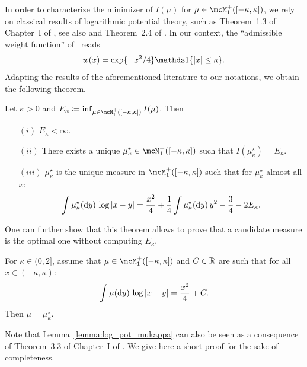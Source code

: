  \myskip 
In order to characterize the minimizer of $I(\mu)$ for $\mu \in \mcM_1^+([-\kappa,\kappa])$, we
rely on classical results of logarithmic potential theory, such as Theorem~1.3 of Chapter~I of \cite{saff2013logarithmic}, see also \cite{mhaskar1985does} and Theorem~2.4 of \cite{arous1997large}.
In our context, the ``admissible weight function'' of~\cite{saff2013logarithmic} reads
\begin{equation*}
    w(x) = \exp\{-x^2/4\} \indi\{|x| \leq \kappa\}.
\end{equation*}
Adapting the results of the aforementioned literature to our notations, we obtain the following theorem.
\begin{theorem}
    \label{thm:properties_inf_I}
    Let $\kappa > 0$ and
    $E_\kappa \coloneqq \inf_{\mu \in \mcM_1^+([-\kappa,\kappa])} I(\mu)$. Then
    \begin{itemize}
        \item[$(i)$] $E_\kappa < \infty$.
        \item[$(ii)$] There exists a unique $\mu_\kappa^\star \in \mcM_1^+([-\kappa,\kappa])$ such that $I(\mu_\kappa^\star) = E_\kappa$.
        \item[$(iii)$] $\mu_\kappa^\star$ is the unique measure in $\mcM_1^+([-\kappa,\kappa])$ such that for $\mu_\kappa^\star$-almost all $x$: 
        \begin{equation*}
            \int \mu_\kappa^\star(\mathrm{d} y) \, \log |x - y| = \frac{x^2}{4} + \frac{1}{4} \int \mu_\kappa^\star(\mathrm{d} y) \, y^2 - \frac{3}{4} - 2 E_\kappa.
        \end{equation*}
    \end{itemize} 
\end{theorem}
\noindent
One can further show that this theorem allows to prove that a candidate measure is the optimal one without computing $E_\kappa$.
\begin{lemma}\label{lemma:log_pot_mukappa}
    For $\kappa \in (0,2]$, assume that $\mu \in \mcM_1^+([-\kappa,\kappa])$ and $C \in \mathbb{R}$ are such that for all $x \in (-\kappa,\kappa)$:
    \begin{equation}\label{eq:log_pot_mukappa_hyp}
        \int \mu(\mathrm{d} y) \, \log |x - y| = \frac{x^2}{4} + C.
    \end{equation}
    Then $\mu = \mu_\kappa^\star$.
\end{lemma}
\noindent
Note that Lemma~\ref{lemma:log_pot_mukappa} can also be seen as a consequence of Theorem~3.3 of Chapter~I of \cite{saff2013logarithmic}. 
We give here a short proof for the sake of completeness.
